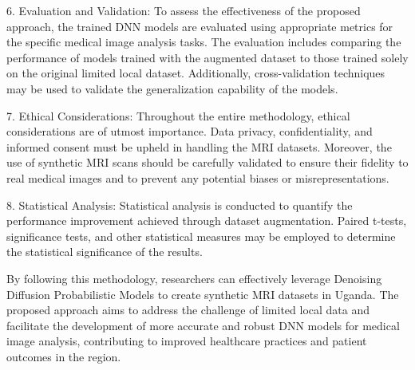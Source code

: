 6. Evaluation and Validation:
To assess the effectiveness of the proposed approach, the trained DNN models are evaluated using appropriate metrics for the specific medical image analysis tasks. The evaluation includes comparing the performance of models trained with the augmented dataset to those trained solely on the original limited local dataset. Additionally, cross-validation techniques may be used to validate the generalization capability of the models.

7. Ethical Considerations:
Throughout the entire methodology, ethical considerations are of utmost importance. Data privacy, confidentiality, and informed consent must be upheld in handling the MRI datasets. Moreover, the use of synthetic MRI scans should be carefully validated to ensure their fidelity to real medical images and to prevent any potential biases or misrepresentations.

8. Statistical Analysis:
Statistical analysis is conducted to quantify the performance improvement achieved through dataset augmentation. Paired t-tests, significance tests, and other statistical measures may be employed to determine the statistical significance of the results.

By following this methodology, researchers can effectively leverage Denoising Diffusion Probabilistic Models to create synthetic MRI datasets in Uganda. The proposed approach aims to address the challenge of limited local data and facilitate the development of more accurate and robust DNN models for medical image analysis, contributing to improved healthcare practices and patient outcomes in the region.
